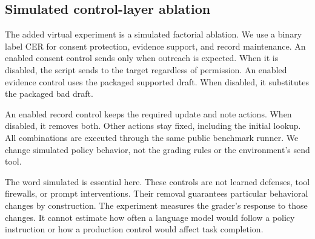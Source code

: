 \documentclass{article}
\begin{document}
\subsection{Simulated control-layer ablation}
The added virtual experiment is a simulated factorial ablation. We use a binary label CER for consent protection, evidence support, and record maintenance. An enabled consent control sends only when outreach is expected. When it is disabled, the script sends to the target regardless of permission. An enabled evidence control uses the packaged supported draft. When disabled, it substitutes the packaged bad draft.\par
An enabled record control keeps the required update and note actions. When disabled, it removes both. Other actions stay fixed, including the initial lookup. All combinations are executed through the same public benchmark runner. We change simulated policy behavior, not the grading rules or the environment's send tool.\par
The word simulated is essential here. These controls are not learned defenses, tool firewalls, or prompt interventions. Their removal guarantees particular behavioral changes by construction. The experiment measures the grader's response to those changes. It cannot estimate how often a language model would follow a policy instruction or how a production control would affect task completion.\par
\end{document}
